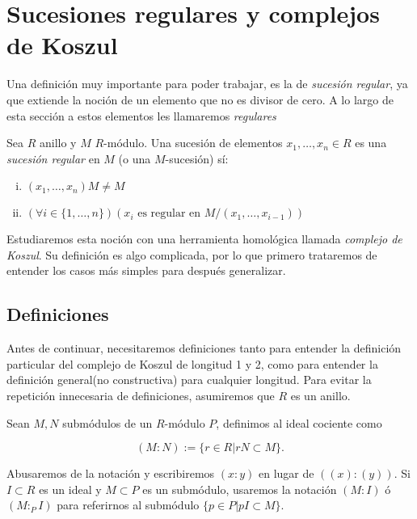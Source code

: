 \section{Sucesiones regulares y complejos de Koszul}

Una definición muy importante para poder trabajar, es la de \emph{sucesión regular}, ya que extiende la noción de un elemento que no es divisor de cero. A lo largo de esta sección a estos elementos les llamaremos \emph{regulares}

\begin{definition}

Sea $R$ anillo y $M$ $R$-módulo. Una sucesión de elementos $x_1,\dots,x_n \in R$ es una \emph{sucesión regular} en $M$ (o una $M$-sucesión) sí:

\begin{enumerate}[i)]
\item $(x_1,\dots,x_n)M \neq M$
\item $(\forall i \in \{1,\dots, n\})(x_i \textrm{ es regular en } M/(x_1,\dots, x_{i-1}))$
\end{enumerate}

\end{definition}

Estudiaremos esta noción con una herramienta homológica llamada \emph{complejo de Koszul}. Su definición es algo complicada, por lo que primero trataremos de entender los casos más simples para después generalizar.

\subsection{Definiciones}

Antes de continuar, necesitaremos definiciones tanto para entender la definición particular del complejo de Koszul de longitud 1 y 2, como para entender la definición general(no constructiva) para cualquier longitud. Para evitar la repetición innecesaria de definiciones, asumiremos que $R$ es un anillo.



\begin{definition}
Sean $M, N$ submódulos de un $R$-módulo $P$, definimos al ideal cociente como

$$(M:N) := \{r \in R|rN\subset M\}.$$

Abusaremos de la notación y escribiremos $(x:y)$ en lugar de $((x):(y))$. Si $I \subset R$ es un ideal y $M \subset P$ es un submódulo, usaremos la notación $(M:I)$ ó $(M:_PI)$ para referirnos al submódulo $\{p \in P|pI \subset M\}$. 

\end{definition}

